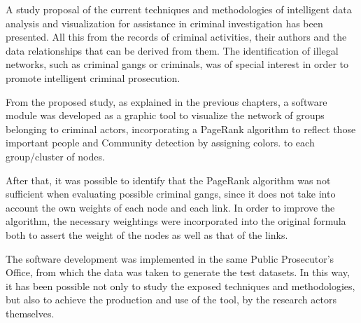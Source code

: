 A study proposal of the current techniques and methodologies of intelligent data analysis and visualization for assistance in criminal investigation has been presented. All this from the records of criminal activities, their authors and the data relationships that can be derived from them. The identification of illegal networks, such as criminal gangs or criminals, was of special interest in order to promote intelligent criminal prosecution.

From the proposed study, as explained in the previous chapters, a software module was developed as a graphic tool to visualize the network of groups belonging to criminal actors, incorporating a PageRank algorithm to reflect those important people and Community detection by assigning colors. to each group/cluster of nodes.

After that, it was possible to identify that the PageRank algorithm was not sufficient when evaluating possible criminal gangs, since it does not take into account the own weights of each node and each link. In order to improve the algorithm, the necessary weightings were incorporated into the original formula both to assert the weight of the nodes as well as that of the links.

The software development was implemented in the same Public Prosecutor's Office, from which the data was taken to generate the test datasets. In this way, it has been possible not only to study the exposed techniques and methodologies, but also to achieve the production and use of the tool, by the research actors themselves.


